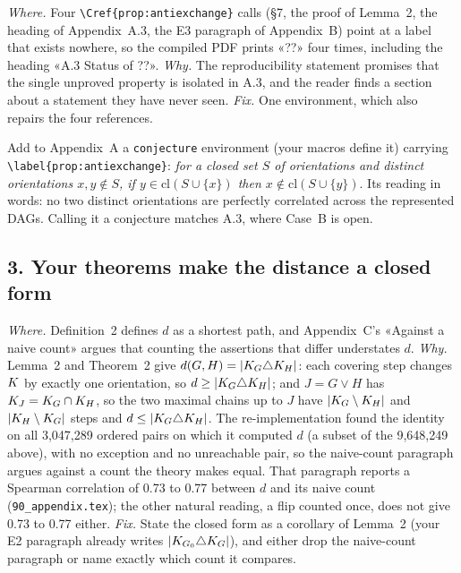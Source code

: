 \emph{Where.} Four \verb|\Cref{prop:antiexchange}| calls (\S7, the proof of Lemma~2, the heading of
Appendix~A.3, the E3 paragraph of Appendix~B) point at a label that exists nowhere, so the compiled PDF
prints «??» four times, including the heading «A.3 Status of ??». \emph{Why.} The reproducibility
statement promises that the single unproved property is isolated in A.3, and the reader finds a section
about a statement they have never seen. \emph{Fix.} One environment, which also repairs the four
references.

\begin{noprato}
Add to Appendix~A a \texttt{conjecture} environment (your macros define it) carrying
\texttt{\textbackslash label\{prop:antiexchange\}}: \emph{for a closed set $S$ of orientations and
distinct orientations $x, y \notin S$, if $y \in \mathrm{cl}(S \cup \{x\})$ then $x \notin \mathrm{cl}(S
\cup \{y\})$}. Its reading in words: no two distinct orientations are perfectly correlated across the
represented DAGs. Calling it a conjecture matches A.3, where Case~B is open.
\end{noprato}

\subsection*{3. Your theorems make the distance a closed form}

\emph{Where.} Definition~2 defines $d$ as a shortest path, and Appendix~C's «Against a naive count»
argues that counting the assertions that differ understates $d$. \emph{Why.} Lemma~2 and Theorem~2 give
$d(G, H) = |K_G \triangle K_H|$: each covering step changes $K$ by exactly one orientation,
so $d \ge |K_G \triangle K_H|$; and $J = G \vee H$ has $K_J = K_G \cap K_H$, so the
two maximal chains up to $J$ have $|K_G \setminus K_H|$ and $|K_H \setminus K_G|$ steps
and $d \le |K_G \triangle K_H|$. The re-implementation found the identity on all 3,047,289
ordered pairs on which it computed $d$ (a subset of the 9,648,249 above), with no exception and no
unreachable pair, so the naive-count paragraph argues against a count the theory makes equal. That
paragraph reports a Spearman correlation of 0.73 to 0.77 between $d$ and its naive count
(\texttt{90\_appendix.tex}); the other natural reading, a flip counted once, does not give 0.73 to
0.77 either. \emph{Fix.} State the closed form as a
corollary of Lemma~2 (your E2 paragraph already writes $|K_{G_0} \triangle K_G|$), and either
drop the naive-count paragraph or name exactly which count it compares.

